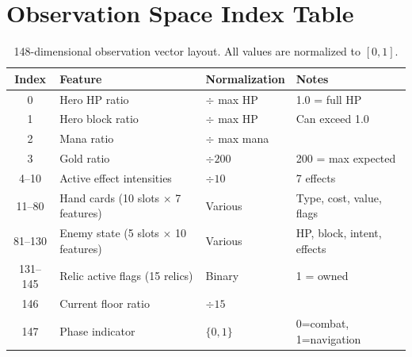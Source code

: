 \section{Observation Space Index Table}
\label{app:obs}

\begin{table}[H]
    \centering
    \caption{148-dimensional observation vector layout. All values are normalized to $[0, 1]$.}
    \label{tab:obs_space}
    \begin{tabular}{clll}
        \toprule
        \textbf{Index} & \textbf{Feature} & \textbf{Normalization} & \textbf{Notes} \\
        \midrule
        0     & Hero HP ratio         & $\div$ max HP          & 1.0 = full HP \\
        1     & Hero block ratio      & $\div$ max HP          & Can exceed 1.0 \\
        2     & Mana ratio            & $\div$ max mana        & \\
        3     & Gold ratio            & $\div 200$             & 200 = max expected \\
        4--10 & Active effect intensities & $\div 10$         & 7 effects \\
        11--80 & Hand cards (10 slots $\times$ 7 features) & Various & Type, cost, value, flags \\
        81--130 & Enemy state (5 slots $\times$ 10 features) & Various & HP, block, intent, effects \\
        131--145 & Relic active flags (15 relics) & Binary & 1 = owned \\
        146   & Current floor ratio   & $\div 15$              & \\
        147   & Phase indicator       & $\{0, 1\}$             & 0=combat, 1=navigation \\
        \bottomrule
    \end{tabular}
\end{table}
